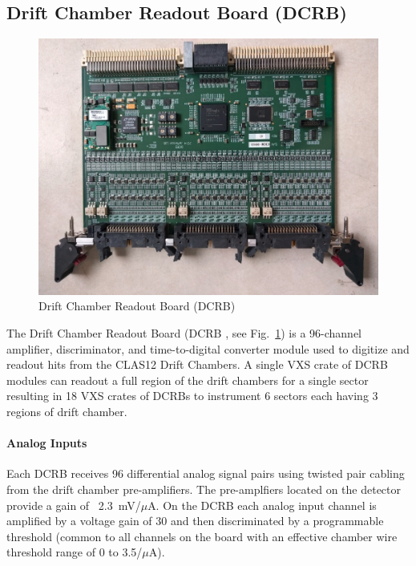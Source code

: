 \subsection{Drift Chamber Readout Board (DCRB)}

\begin{figure}[hbt]
	\centering
	\includegraphics[width=1.0\columnwidth,keepaspectratio]{img/dcrb_board.png}
	\caption{Drift Chamber Readout Board (DCRB)}
	\label{fig:dcrb_board}
\end{figure}

The Drift Chamber Readout Board (DCRB \cite{dcrb-ref}, see Fig.~\ref{fig:dcrb_board}) is a 96-channel amplifier, discriminator, and time-to-digital converter module used to digitize and readout hits from the CLAS12 Drift Chambers. A single VXS crate of DCRB modules can readout a full region of the drift chambers for a single sector resulting in 18 VXS crates of DCRBs to instrument 6 sectors each having 3 regions of drift chamber.

\paragraph{Analog Inputs}
Each DCRB receives 96 differential analog signal pairs using twisted pair cabling from the drift chamber pre-amplifiers. The pre-amplfiers located on the detector provide a gain of ~2.3~mV/$\mu$A. On the DCRB each analog input channel is amplified by a voltage gain of 30 and then discriminated by a programmable threshold (common to all channels on the board with an effective chamber wire threshold range of 0 to 3.5/$\mu$A).

